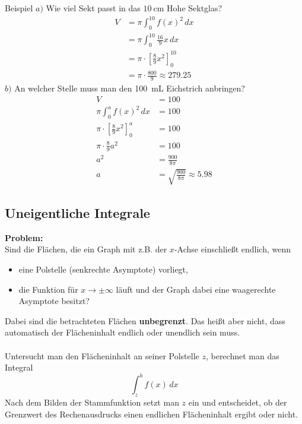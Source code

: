 \documentclass{article}
\begin{document}
\begin{boxx}[DarkBlue]{Beispiel}
    $a)$\hspace{3mm} Wie viel Sekt passt in das $\qty{10}{\centi\meter}$ Hohe Sektglas?
    \begin{align*}
        V &= \pi \int_0^{10} f(x)^2 \, dx \\
        &= \pi \int_0^{10} \frac{16}{9} x \, dx \\
        &= \pi \cdot \left[\frac{8}{9} x^2\right]_0^{10} \\
        &= \pi \cdot \frac{800}{9} \approx 279.25
    \end{align*}
    $b)$\hspace{3mm} An welcher Stelle muss man den \qty{100}{\milli\liter} Eichstrich anbringen?
    \begin{align*}
        V &= 100 \\
        \pi \int_0^a f(x)^2 \, dx &= 100 \\
        \pi \cdot \left[\frac{8}{9}x^2\right]_0^a &= 100 \\
        \pi \cdot \frac{8}{9} a^2 &= 100 \\
        a^2 &= \frac{900}{8 \pi } \\
        a &= \sqrt{\frac{900}{8 \pi}} \approx 5.98
    \end{align*}
\end{boxx}

\newpage

\subsection{Uneigentliche Integrale}
\textbf{Problem:} \\
Sind die Flächen, die ein Graph mit z.B. der $x$-Achse einschließt endlich, wenn
\begin{itemize}
    \item eine Polstelle (senkrechte Asymptote) vorliegt,
    \item die Funktion für $x \to \pm \infty$ läuft und der
    Graph dabei eine waagerechte Asymptote besitzt?
\end{itemize}
Dabei sind die betrachteten Flächen \textbf{unbegrenzt}.
Das heißt aber nicht, dass automatisch der Flächeninhalt endlich
oder unendlich sein muss.
\\\\
Untersucht man den Flächeninhalt an seiner Polstelle $z$, berechnet man das Integral
\[\int_z^b f(x) \, dx\]
Nach dem Bilden der Stammfunktion setzt man $z$ ein und entscheidet, 
ob der Grenzwert des Rechenausdrucks einen endlichen Flächeninhalt
ergibt oder nicht.
\end{document}
